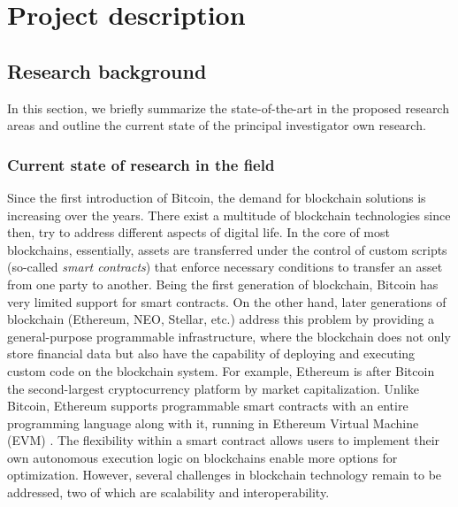 \newpage
\setcounter{page}{1}
\section{Project description}

\subsection{Research background}

In this section, we briefly summarize the state-of-the-art in the proposed
research areas and outline the current state of the principal investigator own
research.

\subsubsection{Current state of research in the field}
Since the first introduction of Bitcoin, the demand for blockchain solutions is
increasing over the years. There exist a multitude of blockchain technologies since
then, try to address different aspects of digital life. In the core of most
blockchains, essentially, assets are transferred under the control of custom
scripts (so-called \emph{smart contracts}) that enforce necessary conditions to
transfer an asset from one party to another. Being the first generation of
blockchain, Bitcoin has very limited support for smart contracts. On the other
hand, later generations of blockchain (Ethereum, NEO, Stellar, etc.) address
this problem by providing a general-purpose programmable infrastructure, where
the blockchain does not only store financial data but also have the capability
of deploying and executing custom code on the blockchain system. For example,
Ethereum is after Bitcoin the second-largest cryptocurrency platform by market
capitalization. Unlike Bitcoin, Ethereum supports programmable smart contracts
with an entire programming language along with it, running in Ethereum Virtual
Machine (EVM) \cite{ethereum:evm}. The flexibility within a smart contract
allows users to implement their own autonomous execution logic on blockchains
enable more options for optimization. However, several challenges in blockchain
technology remain to be addressed, two of which are scalability and
interoperability.

